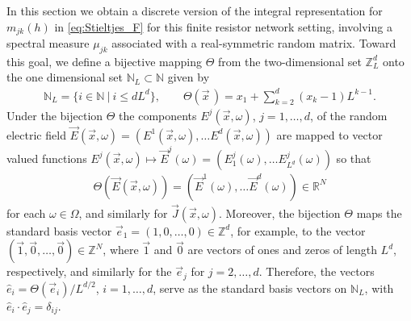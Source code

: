 \documentclass{cmslatex}
\begin{document}
In this section we obtain a discrete version of the integral
representation for $m_{jk}(h)$ in \eqref{eq:Stieltjes_F} for this
finite resistor network setting, involving a spectral measure $\mu_{jk}$
associated with a real-symmetric random matrix. Toward this goal, we
define a bijective mapping $\Theta$ from the two-dimensional set
$\mathbb{Z}_L^d$ onto the one dimensional set $\mathbb{N}_L\subset\mathbb{N}$
given by 
% 
\begin{align}\label{eq:Bijection_Z_N}
  \mathbb{N}_L=\{i\in\mathbb{N} \ | \ i\leq dL^d\}, \qquad
  \Theta(\vec{x}\,)=x_1+\sum_{k=2}^d(x_k-1)L^{k-1}.
\end{align}
%
Under the bijection $\Theta$ the components $E^j(\vec{x},\omega)$, $j=1,\ldots,d$, of
the random electric field
$\vec{E}(\vec{x},\omega)=(E^1(\vec{x},\omega),\ldots E^d(\vec{x},\omega))$ are mapped to
vector valued functions $E^j(\vec{x},\omega)\mapsto\vec{E}^j(\omega)=(E^j_1(\omega),\ldots
E^j_{L^d}(\omega))$ so that
% 
\begin{align}\label{eq:bijection_vector_mapping}
  \Theta(\vec{E}(\vec{x},\omega))=(\vec{E}^1(\omega),\ldots \vec{E}^d(\omega))\in\mathbb{R}^N
\end{align}
%
for each $\omega\in\Omega$, and similarly for $\vec{J}(\vec{x},\omega)$. Moreover, the
bijection $\Theta$ maps the standard basis vector
$\vec{e}_1=(1,0,\ldots,0)\in\mathbb{Z}^d$, for example, to the
vector $(\vec{1},\vec{0},\ldots,\vec{0})\in\mathbb{Z}^N$, where
$\vec{1}$ and $\vec{0}$ are vectors of ones and zeros of length
$L^d$, respectively, and similarly for the $\vec{e}_j$ for
$j=2,\ldots,d$. Therefore, the vectors $\hat{e}_i=\Theta(\vec{e}_i)/L^{d/2}$,
$i=1,\ldots,d$, serve as the standard basis vectors on $\mathbb{N}_L$, with
$\hat{e}_i\cdot\hat{e}_j=\delta_{ij}$.
\end{document}
